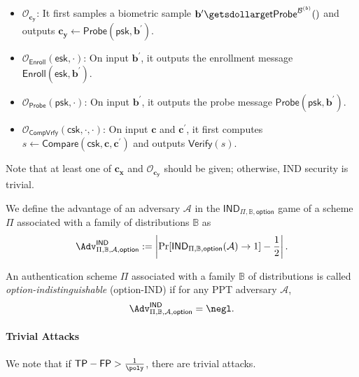 \begin{itemize}

	\item $\mathcal{O}_{\mathbf{c_y}}$: It first samples a biometric sample $\mathbf{b}^{\prime} \getsdollar \textsf{getProbe}^{\mathcal{B}^{(b)} }()$ and outputs $\mathbf{c_y} \gets \textsf{Probe}(\textsf{psk}, \mathbf{b}^{\prime})$.

	\item $\mathcal{O}_\textsf{Enroll}(\textsf{esk}, \cdot)$: On input $\mathbf{b}^\prime$, it outputs the enrollment message $\textsf{Enroll}(\textsf{esk}, \mathbf{b}^\prime)$.

	\item $\mathcal{O}_\textsf{Probe}(\textsf{psk}, \cdot)$: On input $\mathbf{b}^\prime$, it outputs the probe message $\textsf{Probe}(\textsf{psk}, \mathbf{b}^\prime)$.
	
	\item $\mathcal{O}_\textsf{CompVrfy}(\textsf{csk}, \cdot, \cdot)$: On input $\mathbf{c}$ and $\mathbf{c}^\prime$, it first computes $s \gets \textsf{Compare}(\textsf{csk}, \mathbf{c}, \mathbf{c}^\prime)$ and outputs $\textsf{Verify}(s)$.
\end{itemize}

\noindent Note that at least one of $\mathbf{c_x}$ and $\mathcal{O}_{\mathbf{c_y}}$ should be given; otherwise, IND security is trivial.

We define the advantage of an adversary $\mathcal{A}$ in the $\textsf{IND}_{\Pi, \mathbb{B}, \textsf{option}}$ game of a scheme $\Pi$ associated with a family of distributions $\mathbb{B}$ as
\[
	\Adv^{\textsf{IND}}_{\Pi, \mathbb{B}, \mathcal{A}, \textsf{option}} := \left |\Pr[\textsf{IND}_{\Pi, \mathbb{B}, \textsf{option}}(\mathcal{A}) \to 1] - \frac{1}{2} \right|.
\]

An authentication scheme $\Pi$ associated with a family $\mathbb{B}$ of distributions is called \emph{\textsf{option}-indistinguishable} (\textsf{option}-IND) if for any PPT adversary $\mathcal{A}$,
\[
	\Adv^{\textsf{IND}}_{\Pi, \mathbb{B}, \mathcal{A}, \textsf{option}} = \negl.
\]


\paragraph{Trivial Attacks}
We note that if $\textsf{TP} - \textsf{FP} > \frac{1}{\poly}$, there are trivial attacks.

